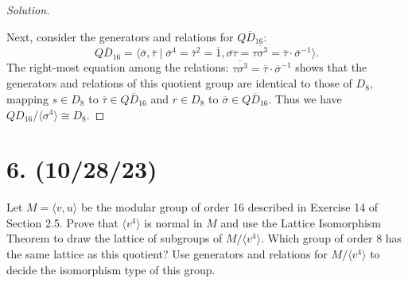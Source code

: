 \documentclass{article}
\begin{document}
\begin{proof}[Solution]
\begin{center}
    \end{center}

    Next, consider the generators and relations for $\overline{QD_{16}}$:
    \begin{equation*}
        \overline{QD_{16}} = \langle \overline{\sigma}, \overline{\tau} \mid \overline{\sigma}^4 = \overline{\tau}^2 = \overline{1}, \overline{\sigma \tau} = \overline{\tau \sigma^3} = \overline{\tau} \cdot \overline{\sigma}^{-1} \rangle.
    \end{equation*}
    The right-most equation among the relations: $\overline{\tau \sigma^3} = \overline{\tau} \cdot \overline{\sigma}^{-1}$ shows that the generators and relations of this quotient group are identical to those of $D_8$, mapping $s \in D_8$ to $\overline{\tau} \in \overline{QD_{16}}$ and $r \in D_8$ to $\overline{\sigma} \in \overline{QD_{16}}$. Thus we have $QD_{16}/\langle \sigma^4 \rangle \cong D_8$.
\end{proof}

\section*{6. (10/28/23)}

Let $M = \langle v, u \rangle$ be the modular group of order 16 described in Exercise 14 of Section 2.5. Prove that $\langle v^4 \rangle$ is normal in $M$ and use the Lattice Isomorphism Theorem to draw the lattice of subgroups of $M/\langle v^4 \rangle$. Which group of order 8 has the same lattice as this quotient? Use generators and relations for $M/\langle v^4 \rangle$ to decide the isomorphism type of this group.
\end{document}
